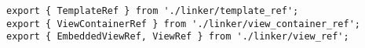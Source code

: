 \begin{verbatim}
export { TemplateRef } from './linker/template_ref';
export { ViewContainerRef } from './linker/view_container_ref';
export { EmbeddedViewRef, ViewRef } from './linker/view_ref';
\end{verbatim}
